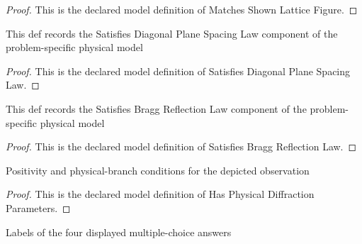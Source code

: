 \begin{proof}
  This is the declared model definition of Matches Shown Lattice Figure.
\end{proof}
\begin{definition}
  \label{def:physics:phyx-mini-0080:phyxminiproblems-problemphyxmini0080-satisfiesdiagonalplanespacinglaw}
  This def records the Satisfies Diagonal Plane Spacing Law component of the problem-specific physical model
\end{definition}
\begin{proof}
  This is the declared model definition of Satisfies Diagonal Plane Spacing Law.
\end{proof}
\begin{definition}
  \label{def:physics:phyx-mini-0080:phyxminiproblems-problemphyxmini0080-satisfiesbraggreflectionlaw}
  This def records the Satisfies Bragg Reflection Law component of the problem-specific physical model
\end{definition}
\begin{proof}
  This is the declared model definition of Satisfies Bragg Reflection Law.
\end{proof}
\begin{definition}
  \label{def:physics:phyx-mini-0080:phyxminiproblems-problemphyxmini0080-hasphysicaldiffractionparameters}
  Positivity and physical-branch conditions for the depicted observation
\end{definition}
\begin{proof}
  This is the declared model definition of Has Physical Diffraction Parameters.
\end{proof}
\begin{definition}
  \label{def:physics:phyx-mini-0080:phyxminiproblems-problemphyxmini0080-answerchoice}
  Labels of the four displayed multiple-choice answers
\end{definition}
